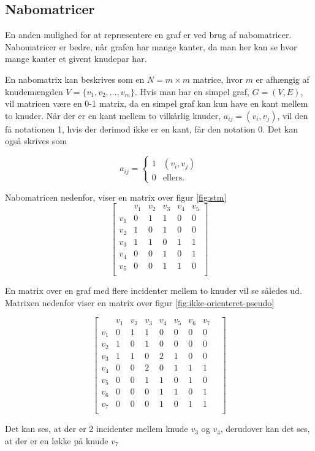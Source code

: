 \subsection{Nabomatricer}
En anden mulighed for at repræsentere en graf er ved brug af nabomatricer. Nabomatricer er bedre, når grafen har mange kanter, da man her kan se hvor mange kanter et givent knudepar har.

En nabomatrix kan beskrives som en $N=m \times m$ matrice, hvor $m$ er afhængig af knudemængden $V=\{v_1, v_2, \dotsc, v_m\}$. Hvis man har en simpel graf, $G=(V,E)$, vil matricen være en 0-1 matrix, da en simpel graf kan kun have en kant mellem to knuder. Når der er en kant mellem to  vilkårlig knuder, $a_{ij}=(v_i,v_j)$,  vil den få notationen 1, hvis der derimod ikke er en kant, får den notation 0.
Det kan også skrives som

\[ a_{ij} = \left\{ \begin{array}{ll}
         1 & (v_i, v_j)\\
        0 & \mbox{ellers}.\end{array} \right. \]


Nabomatricen nedenfor, viser en matrix over figur \ref{fig:stm}
\begin{equation}
	\begin{bmatrix}
		&v_1&v_2&v_3&v_4&v_5 \\
		v_1&0&1&1&0&0 \\
		v_2&1&0&1&0&0 \\
		v_3&1&1&0&1&1 \\
		v_4&0&0&1&0&1 \\
		v_5&0&0&1&1&0 \\
	\end{bmatrix}
\end{equation}

En matrix over en graf med flere incidenter mellem to knuder vil se således ud. Matrixen nedenfor viser en matrix over figur \ref{fig:ikke-orienteret-pseudo} 

\begin{equation}
	\begin{bmatrix}
	&v_1&v_2&v_3&v_4&v_5&v_6&v_7& \\
	v_1&0&1&1&0&0&0&0 \\
	v_2&1&0&1&0&0&0&0 \\
	v_3&1&1&0&2&1&0&0 \\
	v_4&0&0&2&0&1&1&1 \\
	v_5&0&0&1&1&0&1&0 \\
	v_6&0&0&0&1&1&0&1 \\
	v_7&0&0&0&1&0&1&1 \\	
	\end{bmatrix}
\end{equation}

Det kan ses, at der er 2 incidenter mellem knude $v_3$ og $v_4$, derudover kan det ses, at der er en løkke på knude $v_7$

